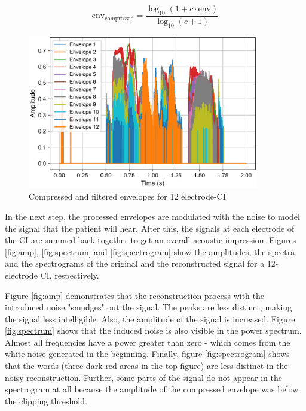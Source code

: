 \documentclass{scrartcl}
\begin{document}
\begin{equation}
\mathrm{env_{compressed}}=\frac{\log _{10}(1+c \cdot \mathrm{env})}{\log _{10}(c+1)}
\end{equation}

\begin{figure}[h]
	\vspace{0.5cm}
	\centering
	\includegraphics[width=0.9\textwidth]{figures/proc_envelopes}
	\caption{Compressed and filtered envelopes for 12 electrode-CI}
	\label{fig:proc_envelopes}
\end{figure}

\vspace{0.5cm}
In the next step, the processed envelopes are modulated with the noise to model the signal that the patient will hear. After this, the signals at each electrode of the CI are summed back together to get an overall acoustic impression. Figures \ref{fig:amp}, \ref{fig:spectrum} and \ref{fig:spectrogram} show the amplitudes, the spectra and the spectrograms of the original and the reconstructed signal for a 12-electrode CI, respectively.

Figure \ref{fig:amp} demonstrates that the reconstruction process with the introduced noise "smudges" out the signal. The peaks are less distinct, making the signal less intelligible. Also, the amplitude of the signal is increased. Figure \ref{fig:spectrum} shows that the induced noise is also visible in the power spectrum. Almost all frequencies have a power greater than zero - which comes from the white noise generated in the beginning. Finally, figure \ref{fig:spectrogram} shows that the words (three dark red areas in the top figure) are less distinct in the noisy reconstruction. Further, some parts of the signal do not appear in the spectrogram at all because the amplitude of the compressed envelope was below the clipping threshold.
\end{document}
